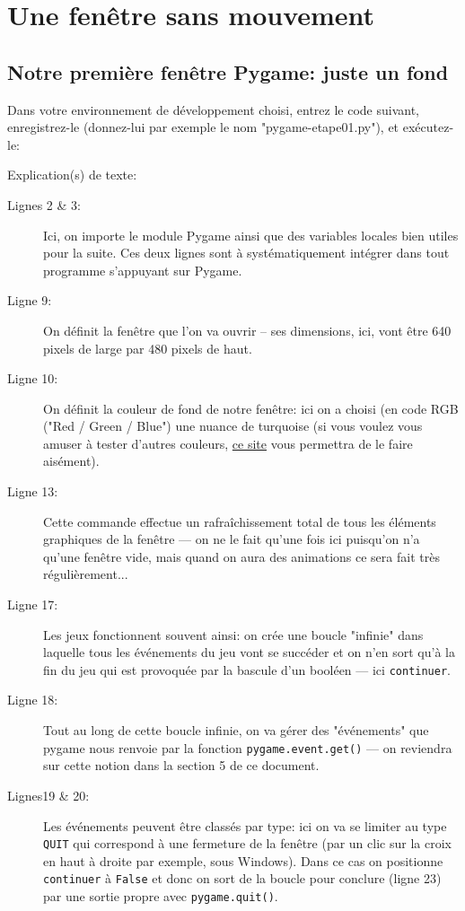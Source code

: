 \documentclass[11pt]{article}
\begin{document}
	\section{Une fenêtre sans mouvement}
	\subsection*{Notre première fenêtre Pygame: juste un fond}
	Dans votre environnement de développement choisi, entrez le code suivant, enregistrez-le (donnez-lui par exemple le nom "pygame-etape01.py"), et exécutez-le:
	\vspace{0.1cm}
	
	Explication(s) de texte:
	\begin{description}
		\item[Lignes 2 \& 3:] Ici, on importe le module Pygame ainsi que des variables locales bien utiles pour la suite. Ces deux lignes sont à systématiquement intégrer dans tout programme s'appuyant sur Pygame.
		\item[Ligne 9:] On définit la fenêtre que l'on va ouvrir -- ses dimensions, ici, vont être 640 pixels de large par 480 pixels de haut.
		\item[Ligne 10:] On définit la couleur de fond de notre fenêtre: ici on a choisi (en code RGB ("Red / Green / Blue") une nuance de turquoise (si vous voulez vous amuser à tester d'autres couleurs, \href{https://www.rapidtables.com/web/color/RGB_Color.html}{ce site} vous permettra de le faire aisément).
		\item[Ligne 13: ] Cette commande effectue un rafraîchissement total de tous les éléments graphiques de la fenêtre --- on ne le fait qu'une fois ici puisqu'on n'a qu'une fenêtre vide, mais quand on aura des animations ce sera fait très régulièrement...
		\item[Ligne 17:] Les jeux fonctionnent souvent ainsi: on crée une boucle "infinie" dans laquelle tous les événements du jeu vont se succéder et on n'en sort qu'à la fin du jeu qui est provoquée par la bascule d'un booléen --- ici \texttt{continuer}.
		\item[Ligne 18:] Tout au long de cette boucle infinie, on va gérer des "événements" que pygame nous renvoie par la fonction \texttt{pygame.event.get()} --- on reviendra sur cette notion dans la section 5 de ce document.
		\item[Lignes19 \& 20:] Les événements peuvent être classés par type: ici on va se limiter au type \texttt{QUIT} qui correspond à une fermeture de la fenêtre (par un clic sur la croix en haut à droite par exemple, sous Windows). Dans ce cas on positionne \texttt{continuer} à \texttt{False} et donc on sort de la boucle pour conclure (ligne 23) par une sortie propre avec \texttt{pygame.quit()}.
	\end{description}
	
\end{document}
